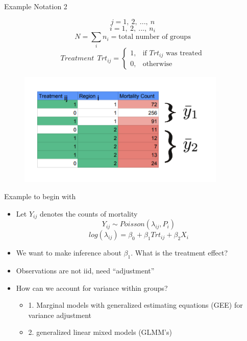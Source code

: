 \documentclass[ignorenonframetext,]{beamer}
\begin{document}
\begin{frame}{Example Notation 2}

\[j = 1,~2,~...,~n\] \[i = 1,~2,~...,~n_i\]
\[N = \sum_i n_i= \text{total number of groups}\]
\[Treatment ~~Trt_{ij} = \begin{cases} 1, & \mbox{if $Trt_{ij}$ was treated} \\ 0, & \mbox{otherwise } \end{cases}\]

\begin{figure}
\centering
\includegraphics[width=3.90625in]{img5.png}
\caption{}
\end{figure}

\end{frame}

\begin{frame}{Example to begin with}

\begin{itemize}
\item
  Let \(Y_{ij}\) denotes the counts of mortality
  \[Y_{ij} \sim Poisson(\lambda_{ij},P_{i})\]
  \[log(\lambda_{ij}) = \beta_0 + \beta_1Trt_{ij} + \beta_2X_i\]
\item
  We want to make inference about \(\beta_1\). What is the treatment
  effect?\\
\item
  Observations are not iid, need ``adjustment''
\item
  How can we account for variance within groups? \small

  \begin{itemize}
  \item 1. Marginal models with generalized estimating equations (GEE) for variance adjustment 
  \item 2. generalized linear mixed models (GLMM's)
  \end{itemize}
\end{itemize}

\end{frame}
\end{document}
